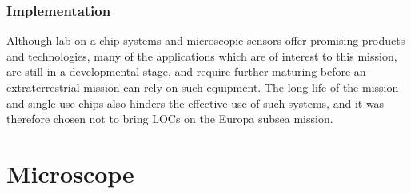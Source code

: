 \subsubsection{Implementation}
Although lab-on-a-chip systems and microscopic sensors offer promising products and technologies, many of the applications which are of interest to this mission, are still in a developmental stage, and require further maturing before an extraterrestrial mission can rely on such equipment. The long life of the mission and single-use chips also hinders the effective use of such systems, and it was therefore chosen not to bring LOCs on the Europa subsea mission.




\section{Microscope}
